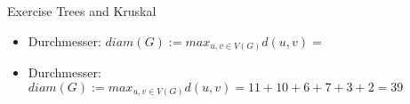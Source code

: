 \begin{frame}[allowframebreaks]{Exercise \thesection}{Trees and Kruskal}
\begin{solutionnoinc}
{\begin{minipage}[t]{18cm}
            \end{minipage}
        }
    \end{solutionnoinc}
    \begin{solutionnoinc}
    \end{solutionnoinc}
    \begin{solutionnoinc}
    \end{solutionnoinc}
    \begin{solutionnoinc}
    \end{solutionnoinc}
    \begin{solution}
    \end{solution}
    \begin{exercisenoinc}
      \begin{itemize}
        \item \alert{Durchmesser:} $diam(G) := max_{u,v\in V(G)} d(u, v) =$
      \end{itemize}
    \end{exercisenoinc}
    \begin{solution}
      \begin{itemize}
        \item \alert{Durchmesser:} $diam(G) := max_{u,v\in V(G)} d(u, v) = 11+10+6+7+3+2 = 39$
      \end{itemize}
\end{solution}
\end{frame}
